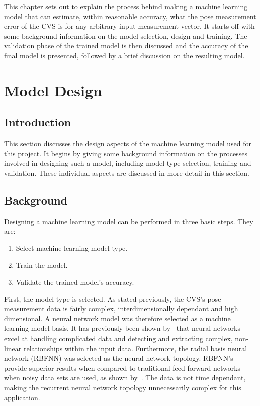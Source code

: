 This chapter sets out to explain the process behind making a machine learning model that can estimate, within reasonable accuracy, what the pose measurement error of the CVS is for any arbitrary input measurement vector. It starts off with some background information on the model selection, design and training. The validation phase of the trained model is then discussed and the accuracy of the final model is presented, followed by a brief discussion on the resulting model. 

\section{Model Design}

\subsection{Introduction}

This section discusses the design aspects of the machine learning model used for this project. It begins by giving some background information on the processes involved in designing such a model, including model type selection, training and validation. These individual aspects are discussed in more detail in this section.  

\subsection{Background}

Designing a machine learning model can be performed in three basic steps. They are:

\begin{enumerate}
  \item Select machine learning model type.
  \item Train the model.
  \item Validate the trained model's accuracy. 
\end{enumerate}

First, the model type is selected. As stated previously, the CVS's pose measurement data is fairly complex, interdimensionally dependant and high dimensional. A neural network model was therefore selected as a machine learning model basis. It has previously been shown by~\cite{tu1996advantages} that neural networks excel at handling complicated data and detecting and extracting complex, non-linear relationships within the input data. Furthermore, the radial basis neural network (RBFNN) was selected as the neural network topology. RBFNN's provide superior results when compared to traditional feed-forward networks when noisy data sets are used, as shown by~\cite{xie2011comparison}. The data is not time dependant, making the recurrent neural network topology unnecessarily complex for this application.  

